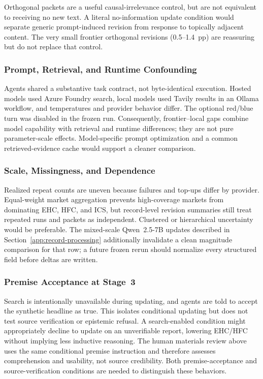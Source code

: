 Orthogonal packets are a useful causal-irrelevance control, but are not equivalent to
receiving no new text.  A literal no-information update condition would separate
generic prompt-induced revision from response to topically adjacent content.  The very
small frontier orthogonal revisions (0.5--1.4~pp) are reassuring but do not replace
that control.

\subsubsection{Prompt, Retrieval, and Runtime Confounding}
Agents shared a substantive task contract, not byte-identical execution.  Hosted models
used Azure Foundry search, local models used Tavily results in an Ollama workflow, and
temperatures and provider behavior differ.  The optional red/blue turn was disabled in
the frozen run.  Consequently, frontier--local gaps combine model capability with
retrieval and runtime differences; they are not pure parameter-scale effects.
Model-specific prompt optimization and a common retrieved-evidence cache would support
a cleaner comparison.

\subsubsection{Scale, Missingness, and Dependence}
Realized repeat counts are uneven because failures and top-ups differ by provider.
Equal-weight market aggregation prevents high-coverage markets from dominating EHC,
HFC, and ICS, but record-level revision summaries still treat repeated runs and packets
as independent.  Clustered or hierarchical uncertainty would be preferable.  The
mixed-scale Qwen~2.5-7B updates described in
Section~\ref{app:record-processing} additionally invalidate a clean magnitude
comparison for that row; a future frozen rerun should normalize every structured field
before deltas are written.

\subsubsection{Premise Acceptance at Stage~3}
Search is intentionally unavailable during updating, and agents are told to accept the
synthetic headline as true.  This isolates conditional updating but does not test source
verification or epistemic refusal.  A search-enabled condition might appropriately
decline to update on an unverifiable report, lowering EHC/HFC without implying less
inductive reasoning. The human materials review above uses the same conditional
premise instruction and therefore assesses comprehension and usability, not
source credibility. Both premise-acceptance and source-verification conditions
are needed to distinguish these behaviors.


